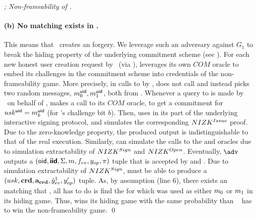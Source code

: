 \begin{proof}[; Non-frameability of \CUASGen]
  \paragraph{(b) No matching \Sig exists in \SIG.} %
  This means that \adv~creates an \UAS forgery. We leverage such an adversary
  against $G_1$ to break the hiding property of the underlying commitment
  scheme (see ). For each new honest user \uid creation
  request by \adv~(via \HUGEN),
  \advB leverages its own $COM$ oracle to embed its challenges in the commitment
  scheme into credentials of the \UAS non-frameability game. More precisely, in
  calls to \HUGEN by \adv, \advB does not call \UKeyGen and instead picks two
  random messages, $m_0^{\mathsf{uid}},m_1^{\mathsf{uid}}$, both from \AttrSpace. Whenever
  a query to \OBTAIN is made by \adv~on behalf of \uid, \advB makes a call to
  its $COM$ oracle, to get a commitment \Ccom for $usk^{\mathsf{uid}}=m_b^{\mathsf{uid}}$
  (for \advB's challenge bit $b$). Then,  \advB uses \Ccom in its \SBCMCom part
  of the underlying \SBCM interactive signing protocol, and simulates the
  corresponding $NIZK^{Issue}$ proof. Due to the zero-knowledge property, the
  produced output is indistinguishable to that of the real execution. Similarly,
  \advB can simulate the calls to the \SIGN and \OPEN oracles due to
  simulation extractability of $NIZK^{Sign}$ and $NIZK^{Open}$.
  Eventually, $\adv$ outputs a $(\mathsf{oid},\boldsymbol{\mathsf{\mathsf{iid}}},\Sigma,m,f_{ev},y_{op},\pi)$
  tuple that is accepted by \Verify and \Judge. Due to simulation extractability
  of $NIZK^{Sign}$, \ExtractSign must be able to produce a $(usk,\mathbf{crd},
  \mathbf{a}_{\mathbf{crd}}, \tilde{y}_{ev}^1,y_{op}')$ tuple. As, by assumption (line 6),  there
  exists an \uid matching that \usk, all \advB has to do is find the
  \uid for which \usk was used as either $m_0$ or $m_1$ in its hiding
  game. Thus, \advB wins its hiding game with the same probability than \adv~
  has to win the non-frameability game.
  \qed
\end{proof}

